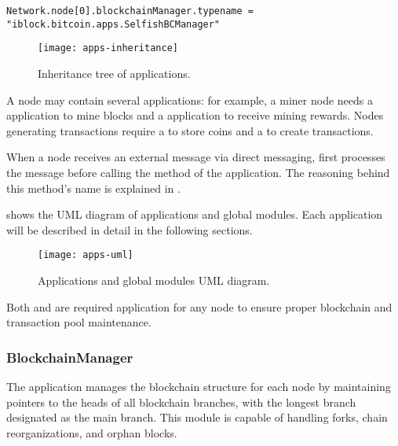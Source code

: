 \footnotesize
\begin{verbatim}
Network.node[0].blockchainManager.typename = "iblock.bitcoin.apps.SelfishBCManager"
\end{verbatim}
\normalsize

\begin{figure}[tbh]
	\centering
	\texttt{[image: apps-inheritance]}
	\caption{Inheritance tree of applications.}\label{fig:app-inheritance}
\end{figure}

A node may contain several applications: for example, a miner node needs a
 application to mine blocks and a  application to
receive mining rewards. Nodes generating transactions require a 
to store coins and a  to create transactions.

When a node receives an external message via direct messaging, 
first processes the message before calling the  method
of the application. The reasoning behind this method's name is explained in
.

 shows the UML diagram of applications and global modules.
Each application will be described in detail in the following sections.

\begin{figure}[tbhp]
	\centering
	\texttt{[image: apps-uml]} \caption{Applications and
	global modules UML diagram.}\label{fig:app-uml}
\end{figure}

Both  and  are required
application for any \iblock{} node to ensure proper blockchain and transaction
pool maintenance.

\subsubsection{BlockchainManager}\label{subsubsec:blockchainmanager}

The  application manages the blockchain structure for
each node by maintaining pointers to the heads of all blockchain branches, with
the longest branch designated as the main branch. This module is capable of
handling forks, chain reorganizations, and orphan blocks.

